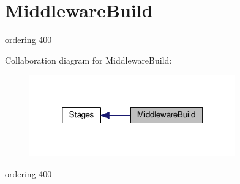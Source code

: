 \hypertarget{group__MiddlewareBuild}{\section{Middleware\-Build}
\label{group__MiddlewareBuild}
}


ordering 400  


Collaboration diagram for Middleware\-Build\-:
\nopagebreak
\begin{figure}[H]
\begin{center}
\leavevmode
\includegraphics[width=252pt]{group__MiddlewareBuild}
\end{center}
\end{figure}
ordering 400 